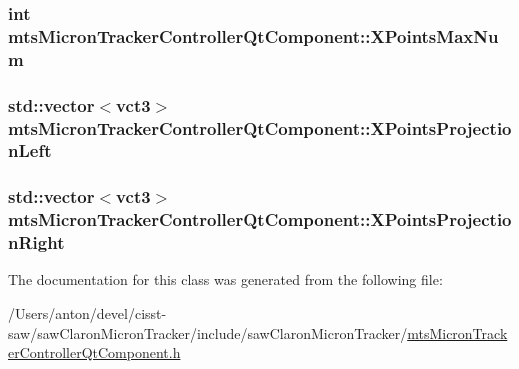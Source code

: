 \subsubsection[{X\+Points\+Max\+Num}]{\setlength{\rightskip}{0pt plus 5cm}int mts\+Micron\+Tracker\+Controller\+Qt\+Component\+::\+X\+Points\+Max\+Num}\label{classmts_micron_tracker_controller_qt_component_addf0cf9703d784ef7870b5b2d35024c4}
\hypertarget{classmts_micron_tracker_controller_qt_component_ab4435aec94942d35c86ade1c60047405}{}
\subsubsection[{X\+Points\+Projection\+Left}]{\setlength{\rightskip}{0pt plus 5cm}std\+::vector$<${\bf vct3}$>$ mts\+Micron\+Tracker\+Controller\+Qt\+Component\+::\+X\+Points\+Projection\+Left}\label{classmts_micron_tracker_controller_qt_component_ab4435aec94942d35c86ade1c60047405}
\hypertarget{classmts_micron_tracker_controller_qt_component_a638d175869aa0a701bc334bfa7d03590}{}
\subsubsection[{X\+Points\+Projection\+Right}]{\setlength{\rightskip}{0pt plus 5cm}std\+::vector$<${\bf vct3}$>$ mts\+Micron\+Tracker\+Controller\+Qt\+Component\+::\+X\+Points\+Projection\+Right}\label{classmts_micron_tracker_controller_qt_component_a638d175869aa0a701bc334bfa7d03590}


The documentation for this class was generated from the following file\+:\begin{DoxyCompactItemize}
\item 
/\+Users/anton/devel/cisst-\/saw/saw\+Claron\+Micron\+Tracker/include/saw\+Claron\+Micron\+Tracker/\hyperlink{mts_micron_tracker_controller_qt_component_8h}{mts\+Micron\+Tracker\+Controller\+Qt\+Component.\+h}\end{DoxyCompactItemize}
